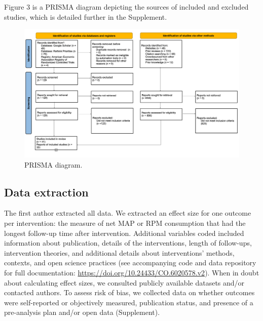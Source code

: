 \documentclass[sn-nature,referee,lineno,pdflatex]{sn-jnl}
\begin{document}
Figure 3 is a PRISMA diagram depicting the sources of included and
excluded studies, which is detailed further in the Supplement.

\begin{figure}[H]

{\centering \includegraphics[width=1.2\linewidth,]{./figures/prisma-diagram} 

}

\caption{PRISMA diagram.}\label{fig:prisma_diagram}
\end{figure}

\subsection{Data extraction}\label{sec3.3}

The first author extracted all data. We extracted an effect size for one
outcome per intervention: the measure of net MAP or RPM consumption that
had the longest follow-up time after intervention. Additional variables
coded included information about publication, details of the
interventions, length of follow-ups, intervention theories, and
additional details about interventions' methods, contexts, and open
science practices (see accompanying code and data repository for full
documentation: \url{https://doi.org/10.24433/CO.6020578.v2}). When in
doubt about calculating effect sizes, we consulted publicly available
datasets and/or contacted authors. To assess risk of bias, we collected
data on whether outcomes were self-reported or objectively measured,
publication status, and presence of a pre-analysis plan and/or open data
(Supplement).
\end{document}
